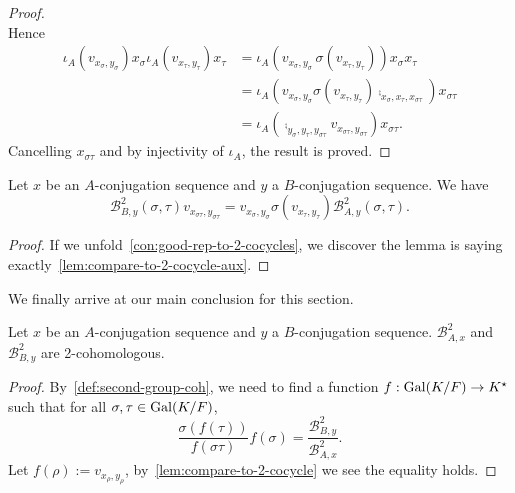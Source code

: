 \begin{proof}
\[  \]
  Hence
  \[
    \begin{aligned}    \iota_{A}\left(v_{x_{\sigma},y_{\sigma}}\right)x_{\sigma}\iota_{A}\left(v_{x_{\tau},y_{\tau}}\right)x_{\tau} &=
                                                                                                                                      \iota_{A}\left(v_{x_{\sigma},y_{\sigma}}\, \sigma\left(v_{x_{\tau},y_{\tau}}\right)\right) x_{\sigma}x_{\tau} \\
      &= \iota_{A}\left(v_{x_{\sigma},y_{\sigma}}\sigma\left(v_{x_{\tau},y_{\tau}}\right)\comp_{x_{\sigma},x_{\tau},x_{\sigma\tau}}\right)x_{\sigma\tau}\\
      &= \iota_{A}\left(\comp_{y_{\sigma},y_{\tau},y_{\sigma\tau}}v_{x_{\sigma\tau},y_{\sigma\tau}}\right)x_{\sigma\tau}.
    \end{aligned}
  \]
  Cancelling $x_{\sigma\tau}$ and by injectivity of $\iota_{A}$, the result is proved.
\end{proof}

\begin{lemma}\label{lem:compare-to-2-cocycle}
  Let $x$ be an $A$-conjugation sequence and $y$ a $B$-conjugation sequence. We have
  \[
    \mathcal{B}^{2}_{B,y}(\sigma,\tau) v_{x_{\sigma\tau},y_{\sigma\tau}} =
    v_{x_{\sigma},y_{\sigma}} \sigma\left(v_{x_{\tau},y_{\tau}}\right) \mathcal{B}^{2}_{A,y}(\sigma,\tau).
  \]
  \leanok
\end{lemma}

\begin{proof}
  If we unfold~\cref{con:good-rep-to-2-cocycles}, we discover the lemma is saying exactly~\cref{lem:compare-to-2-cocycle-aux}.
\end{proof}

We finally arrive at our main conclusion for this section.
\begin{corollary}\label{cor:to-2-cocycle-wd}
  Let $x$ be an $A$-conjugation sequence and $y$ a $B$-conjugation sequence. $\mathcal{B}^{2}_{A,x}$ and $\mathcal{B}^{2}_{B,y}$ are 2-cohomologous.
  \leanok
\end{corollary}
\begin{proof}
  By~\cref{def:second-group-coh}, we need to find a function $f : \operatorname{Gal}(K/F)\to K^{\star}$ such that for all $\sigma, \tau\in\operatorname{Gal}(K/F)$,
  \[
    \frac{\sigma\left(f(\tau)\right)}{f\left(\sigma\tau\right)}f(\sigma)=\frac{\mathcal{B}^{2}_{B,y}}{\mathcal{B}^{2}_{A,x}}.
  \]
  Let $f(\rho) := v_{x_{\rho},y_{\rho}}$, by~\cref{lem:compare-to-2-cocycle} we see the equality holds.
\end{proof}

